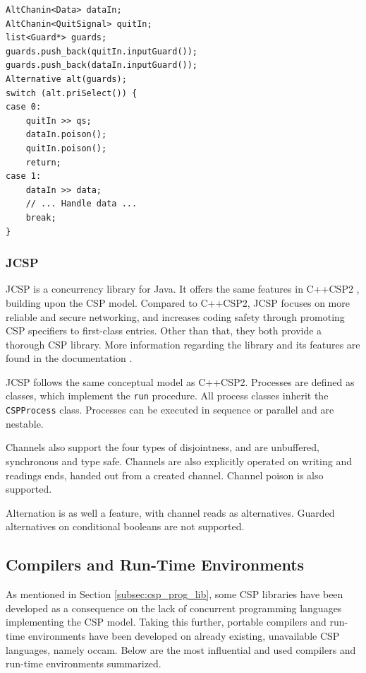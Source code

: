 \begin{lstlisting}[style={CustomC++},frame={},numbers={none},xleftmargin={4em}]
AltChanin<Data> dataIn;
AltChanin<QuitSignal> quitIn;
list<Guard*> guards;
guards.push_back(quitIn.inputGuard());
guards.push_back(dataIn.inputGuard());
Alternative alt(guards);
switch (alt.priSelect()) {
case 0:                                                 
    quitIn >> qs;
    dataIn.poison();
    quitIn.poison();
    return;
case 1:
    dataIn >> data;
    // ... Handle data ...
    break;                          
}
\end{lstlisting}

\subsubsection{JCSP}
\label{sssec:jcsp}

JCSP \citep{jcsp} is a concurrency library for Java. It offers the same features in C++CSP2 \citep{c++csp2}, building upon the CSP model. Compared to C++CSP2, JCSP focuses on more reliable and secure networking, and increases coding safety through promoting CSP specifiers to first-class entries. Other than that, they both provide a thorough CSP library. More information regarding the library and its features are found in the documentation \citep{jcspdoc}. 

JCSP follows the same conceptual model as C++CSP2. Processes are defined as classes, which implement the \texttt{run} procedure. All process classes inherit the \texttt{CSPProcess} class. Processes can be executed in sequence or parallel and are nestable. 

Channels also support the four types of disjointness, and are unbuffered, synchronous and type safe. Channels are also explicitly operated on writing and readings ends, handed out from a created channel. Channel poison is also supported.

Alternation is as well a feature, with channel reads as alternatives. Guarded alternatives on conditional booleans are not supported. 


\subsection{Compilers and Run-Time Environments}
\label{subsec:csp_comp_runtime}

As mentioned in Section \ref{subsec:csp_prog_lib}, some CSP libraries have been developed as a consequence on the lack of concurrent programming languages implementing the CSP model. Taking this further, portable compilers and run-time environments have been developed on already existing, unavailable CSP languages, namely occam. Below are the most influential and used compilers and run-time environments summarized. 


